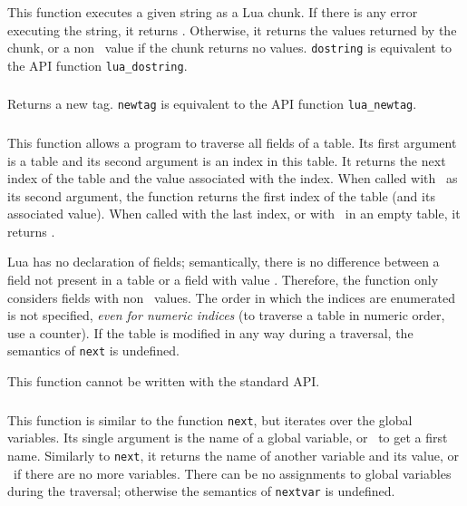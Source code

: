 \subsubsection*{\ff {}}
This function executes a given string as a Lua chunk.
If there is any error executing the string, it returns \nil.
Otherwise, it returns the values returned by the chunk,
or a non \nil\ value if the chunk returns no values.
\verb|dostring| is equivalent to the API function \verb|lua_dostring|.

\subsubsection*{\ff {}}\label{pdf-newtag}
Returns a new tag.
\verb|newtag| is equivalent to the API function \verb|lua_newtag|.

\subsubsection*{\ff {}}
This function allows a program to traverse all fields of a table.
Its first argument is a table and its second argument
is an index in this table.
It returns the next index of the table and the
value associated with the index.
When called with \nil\ as its second argument,
the function returns the first index
of the table (and its associated value).
When called with the last index,
or with \nil\ in an empty table,
it returns \nil.

Lua has no declaration of fields;
semantically, there is no difference between a
field not present in a table or a field with value \nil.
Therefore, the function only considers fields with non \nil\ values.
The order in which the indices are enumerated is not specified,
\emph{even for numeric indices}
(to traverse a table in numeric order, use a counter).
If the table is modified in any way during a traversal,
the semantics of \verb|next| is undefined.

This function cannot be written with the standard API.

\subsubsection*{\ff {}}
This function is similar to the function \verb|next|,
but iterates over the global variables.
Its single argument is the name of a global variable,
or \nil\ to get a first name.
Similarly to \verb|next|, it returns the name of another variable
and its value,
or \nil\ if there are no more variables.
There can be no assignments to global variables during the traversal;
otherwise the semantics of \verb|nextvar| is undefined.

